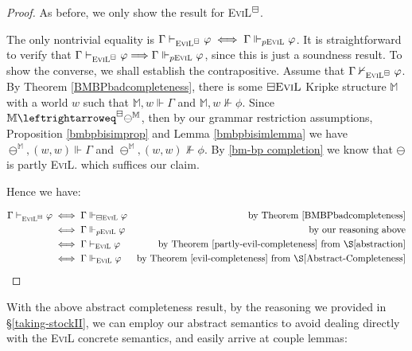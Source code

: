 \begin{proof}
As before, we only show the result for \textsc{EviL}$^\boxminus$.

The only nontrivial equality is $\Gamma \vdash_{\textsc{EviL}^\boxminus} \varphi \iff \Gamma
\Vdash_{p\textup{\textsc{EviL}}} \varphi$. It is straightforward to verify that $\Gamma \vdash_{\textsc{EviL}^\boxminus} \varphi \Longrightarrow \Gamma
\Vdash_{p\textup{\textsc{EviL}}} \varphi$, since this is just a
soundness result.  To show the converse, we shall establish the
contrapositive.  Assume that $\Gamma \nvdash_{\textsc{EviL}^\boxminus}
\varphi$. By Theorem \ref{BMBPbadcompleteness}, there is some $\boxminus\textsc{EviL}$ Kripke structure
$\mathbb{M}$ with a world $w$ such that $\mathbb{M},w \Vdash \Gamma$
and $\mathbb{M},w \nVdash \phi$.  Since
$\mathbb{M}\leftrightarroweq^\BM\ominus^\mathbb{M}$, then by our
grammar restriction assumptions, Proposition \ref{bmbpbisimprop} and
Lemma \ref{bmbpbisimlemma} we have $\ominus^\mathbb{M},(w,w) \Vdash
\Gamma$ and $\ominus^\mathbb{M},(w,w) \nVdash
\phi$.  By \ref{bm-bp completion} we know that $\ominus$ is partly
\textsc{EviL}. which suffices our claim.

Hence we have:

\begin{align*}
\Gamma \vdash_{\textsc{EviL}^\BM} \phi & \iff \Gamma
\Vdash_{\BM\textup{\textsc{EviL}}} \phi & \text{by Theorem \ref{BMBPbadcompleteness}}\\
 & \iff \Gamma \Vdash_{p\textup{\textsc{EviL}}} \phi & \textup{by our
   reasoning above}\\
 & \iff \Gamma \vdash_{\textup{\textsc{EviL}}} \phi & \textup{by
   Theorem \ref{partly-evil-completeness} from \S\ref{abstraction}}\\
 & \iff \Gamma \Vdash_{\textup{\textsc{EviL}}} \phi & \textup{by
   Theorem \ref{evil-completeness} from \S\ref{Abstract-Completeness}}
\end{align*}
\end{proof}

With the above abstract completeness result, by the reasoning we
provided in \S\ref{taking-stockII}, we can employ our abstract semantics
to avoid dealing directly with the \textsc{EviL} concrete semantics,
and easily arrive at couple lemmas:  

